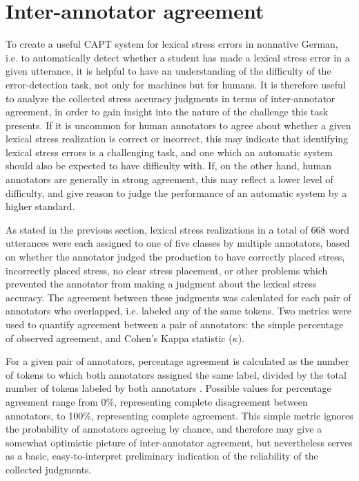 		
	
	\section{Inter-annotator agreement}
	\label{sec:lexstress:agreement}	
	
	To create a useful CAPT system for lexical stress errors in nonnative German, i.e. to automatically detect whether a student has made a lexical stress error in a given utterance, it is helpful to have an understanding of the difficulty of the error-detection task, not only for machines but for humans. It is therefore useful to analyze the collected stress accuracy judgments in terms of inter-annotator agreement, in order to gain insight into the nature of the challenge this task presents. If it is uncommon for human annotators to agree about whether a given lexical stress realization is correct or incorrect, this may indicate that  identifying lexical stress errors is a challenging task, and one which an automatic system should also be expected to have difficulty with. If, on the other hand, human annotators are generally in strong agreement, this may reflect a lower level of difficulty, and give reason to judge the performance of an automatic system by a higher standard.  
	
	As stated in the previous section,
	lexical stress realizations in a total of 
	668 word utterances were each assigned to one of five classes by multiple annotators, based on whether the annotator judged the production to have correctly placed stress, incorrectly placed stress, no clear stress placement, or other problems which prevented the annotator from making a judgment about the lexical stress accuracy. The agreement between these judgments was calculated for each pair of annotators who overlapped, i.e. labeled any of the same tokens. 
		Two metrics were used to quantify agreement between a pair of annotators: the simple percentage of observed agreement, and Cohen's Kappa statistic ($\kappa$). 
		
		For a given pair of annotators, percentage agreement is calculated as the number of tokens to which both annotators assigned the same label, divided by the total number of tokens labeled by both annotators . Possible values for percentage agreement range from 0\%, representing complete disagreement between annotators, to 100\%, representing complete agreement. This simple metric ignores the probability of annotators agreeing by chance, and therefore may give a somewhat optimistic picture of inter-annotator agreement, but nevertheless serves as a basic, easy-to-interpret preliminary indication of the reliability of the collected judgments.
		
